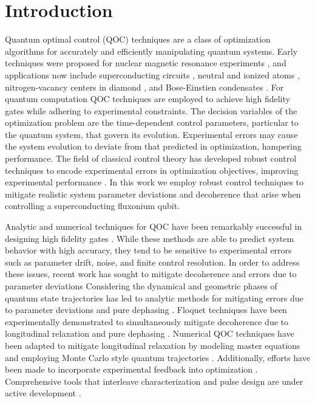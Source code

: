 \section{Introduction}
Quantum optimal control (QOC) techniques are a class of optimization
algorithms for accurately and efficiently manipulating quantum systems.
Early techniques were proposed for nuclear magnetic resonance experiments
\cite{khaneja2005optimal}, and applications now include superconducting
circuits \cite{heeres2017implementing,
  huang2020engineering, leng2019robust, leung2017speedup, xu2020nonadiabatic},
neutral and ionized atoms \cite{van2016optimal}, nitrogen-vacancy centers in
diamond \cite{rembold2020introduction}, and Bose-Einstien condensates
\cite{sorensen2018quantum}. For quantum computation
QOC techniques are employed to achieve high fidelity gates
while adhering to experimental constraints.
The decision variables of the optimization problem are the time-dependent control
parameters, particular to the quantum system, that govern its evolution.
Experimental errors may cause the system evolution to deviate from that predicted in
optimization, hampering performance.
The field of classical control theory has developed robust control techniques
to encode experimental errors in optimization objectives, improving
experimental performance \cite{Zhou97,Morimoto00,Manchester18}.
In this work we employ robust control techniques to mitigate
realistic system parameter deviations and decoherence that arise when controlling
a superconducting fluxonium qubit.

Analytic and numerical techniques for QOC have been remarkably successful in
designing high fidelity gates . 
While these methods are able to predict system behavior with high accuracy, they tend 
to be sensitive to experimental errors such as parameter drift, noise, and finite control 
resolution. 
In order to address these issues,
recent work has sought to mitigate decoherence
and errors due to parameter deviations
Considering the dynamical and geometric phases of quantum state
trajectories has led to analytic methods for mitigating
errors due to parameter deviations and pure dephasing
\cite{han2020experimental, merrill2014progress, xu2020nonadiabatic, zhang2020universal}.
Floquet techniques have been experimentally demonstrated to simultaneously mitigate
decoherence due to longitudinal relaxation and pure dephasing
\cite{huang2020engineering, mundada2020floquet}.
Numerical QOC techniques have been adapted to mitigate longitudinal relaxation
by modeling master equations \cite{rembold2020introduction} and employing
Monte Carlo style quantum trajectories \cite{abdelhafez2019gradient}.
Additionally, efforts have been made to incorporate experimental feedback
into optimization \cite{huang2020engineering}. Comprehensive tools that interleave characterization
and pulse design are under active development \cite{wittler2020integrated}.

